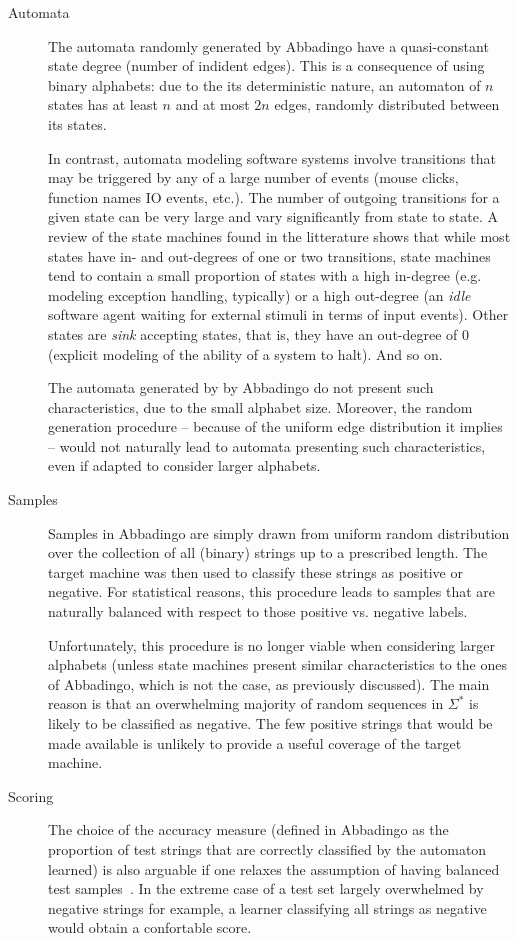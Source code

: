 \begin{description}
\item[Automata] The automata randomly generated by Abbadingo have a quasi-constant state degree (number of indident edges). This is a consequence of using binary alphabets: due to the its deterministic nature, an automaton of $n$ states has at least $n$ and at most $2n$ edges, randomly distributed between its states. 

In contrast, automata modeling software systems involve transitions that may be triggered by any of a large number of events (mouse clicks, function names IO events, etc.). The number of outgoing transitions for a given state can be very large and vary significantly from state to state. A review of the state machines found in the litterature shows that while most states have in- and out-degrees of one or two transitions, state machines tend to contain a small proportion of states with a high in-degree (e.g. modeling exception handling, typically) or a high out-degree (an \emph{idle} software agent waiting for external stimuli in terms of input events). Other states are \emph{sink} accepting states, that is, they have an out-degree of 0 (explicit modeling of the ability of a system to halt). And so on.

The automata generated by by Abbadingo do not present such characteristics, due to the small alphabet size. Moreover, the random generation procedure -- because of the uniform edge distribution it implies -- would not naturally lead to automata presenting such characteristics, even if adapted to consider larger alphabets.

\item[Samples] Samples in Abbadingo are simply drawn from uniform random distribution over the collection of all (binary) strings up to a prescribed length. The target machine was then used to classify these strings as positive or negative. For statistical reasons, this procedure leads to samples that are naturally balanced with respect to those positive vs. negative labels. 

Unfortunately, this procedure is no longer viable when considering larger alphabets (unless state machines present similar characteristics to the ones of Abbadingo, which is not the case, as previously discussed). The main reason is that an overwhelming majority of random sequences in $\Sigma^*$ is likely to be classified as negative. The few positive strings that would be made available is unlikely to provide a useful coverage of the target machine.

\item[Scoring] The choice of the accuracy measure (defined in Abbadingo as the proportion of test strings that are correctly classified by the automaton learned) is also arguable if one relaxes the assumption of having balanced test samples~\cite{Walkinshaw2008}. In the extreme case of a test set largely overwhelmed by negative strings for example, a learner classifying all strings as negative would obtain a confortable score.
\end{description}


